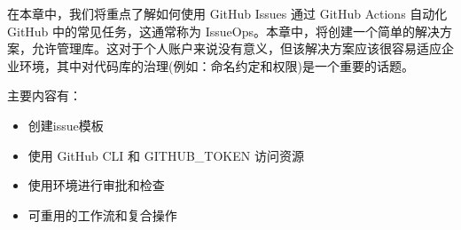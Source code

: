 在本章中，我们将重点了解如何使用 GitHub Issues 通过 GitHub Actions 自动化 GitHub 中的常见任务，这通常称为 IssueOps。本章中，将创建一个简单的解决方案，允许管理库。这对于个人账户来说没有意义，但该解决方案应该很容易适应企业环境，其中对代码库的治理(例如：命名约定和权限)是一个重要的话题。

主要内容有：

\begin{itemize}
\item 
创建issue模板

\item 
使用 GitHub CLI 和 GITHUB\_TOKEN 访问资源

\item 
使用环境进行审批和检查

\item 
可重用的工作流和复合操作
\end{itemize}
